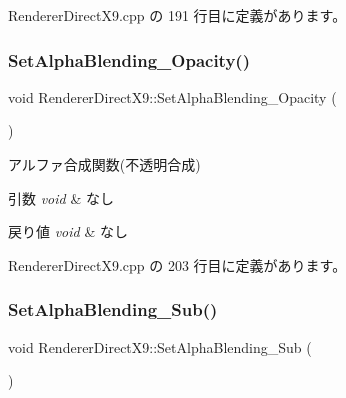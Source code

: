  Renderer\+Direct\+X9.\+cpp の 191 行目に定義があります。

\mbox{\label{class_renderer_direct_x9_a789206ba211e9cbffe0bfe4c7dfb7457}} 
\subsubsection{\texorpdfstring{Set\+Alpha\+Blending\+\_\+\+Opacity()}{SetAlphaBlending\_Opacity()}}
{\footnotesize\ttfamily void Renderer\+Direct\+X9\+::\+Set\+Alpha\+Blending\+\_\+\+Opacity (\begin{DoxyParamCaption}{ }\end{DoxyParamCaption})}



アルファ合成関数(不透明合成) 


\begin{DoxyParams}{引数}
{\em void} & なし \\
\hline
\end{DoxyParams}

\begin{DoxyRetVals}{戻り値}
{\em void} & なし \\
\hline
\end{DoxyRetVals}


 Renderer\+Direct\+X9.\+cpp の 203 行目に定義があります。

\mbox{\label{class_renderer_direct_x9_a6ddbb9f801ef6b2c86ec5cd4e97b317b}} 
\subsubsection{\texorpdfstring{Set\+Alpha\+Blending\+\_\+\+Sub()}{SetAlphaBlending\_Sub()}}
{\footnotesize\ttfamily void Renderer\+Direct\+X9\+::\+Set\+Alpha\+Blending\+\_\+\+Sub (\begin{DoxyParamCaption}{ }\end{DoxyParamCaption})}



